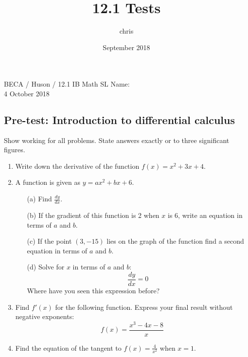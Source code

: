 \documentclass{article}
\title{12.1 Tests}
\author{chris }
\date{September 2018}
\begin{document}
\noindent BECA / Huson / 12.1 IB Math SL \qquad \qquad Name:\\
4 October 2018
\subsection*{Pre-test: Introduction to differential calculus}
Show working for all problems. State answers exactly or to three significant figures.

\begin{enumerate}

\item Write down the derivative of the function $f(x) = x^2 + 3x + 4$.

\item	A function is given as $y = ax^2 + bx + 6$.

\begin{itemize}
    \item[(a)] Find $\displaystyle \frac {dy}{dx}$.
	\item[(b)] If the gradient of this function is 2 when $x$ is 6, write an equation in terms of $a$ and $b$.
	\item[(c)] If the point $(3, -15)$ lies on the graph of the function find a second equation in terms of $a$ and $b$.
	\item[(d)] Solve for $x$ in terms of $a$ and $b$:
	\[\frac {dy}{dx}=0\]
	Where have you seen this expression before?
\end{itemize}

\item Find $f'(x)$  for the following function. Express your final result without negative exponents:
	 \[	f(x) = \frac{x^3-4x-8}{x}\]

\item Find the equation of the tangent to $\displaystyle f(x) = \frac{4}{x^2}$ when $x = 1$.


\end{enumerate}
\end{document}
